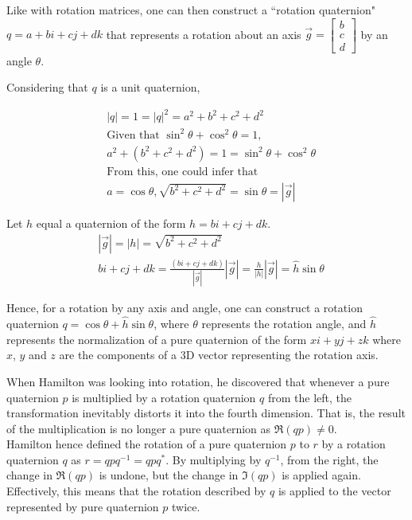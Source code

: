 \documentclass[12pt, a4paper]{article}
\begin{document}
Like with rotation matrices, one can then construct a ``rotation quaternion" $q =
a + bi + cj +dk$ that represents a rotation about an axis $\vec{g} =
\begin{bmatrix} b \\ c \\ d \end{bmatrix}$ by an angle $\theta$. %

Considering that $q$ is a unit quaternion,

\begin{align*}
    &|q| = 1 = |q|^2 = a^2 + b^2 + c^2 + d^2 \\
    &\text{Given that } \sin^2\theta + \cos^2\theta = 1, \\
    &a^2 + (b^2 + c^2 + d^2) = 1 = \sin^2\theta + \cos^2\theta \\
    &\text{From this, one could infer that} \\
    &a = \cos\theta, \sqrt{b^2 + c^2 + d^2} = \sin\theta = |\vec{g}|
\end{align*}

Let $h$ equal a quaternion of the form $h = bi + cj + dk$.
\begin{align*}
    &|\vec{g}| = |h| = \sqrt{b^2 + c^2 + d^2} \\
    &bi + cj + dk = \frac{(bi + cj + dk)}{|\vec{g}|}|\vec{g}| = \frac{h}{|h|}|\vec{g}| = \hat{h}\sin\theta
\end{align*}

Hence, for a rotation by any axis and angle, one can construct a rotation
quaternion $q = \cos\theta + \hat{h}\sin\theta$, where $\theta$ represents the
rotation angle, and $\hat{h}$ represents the normalization of a pure quaternion
of the form $xi + yj + zk$ where $x$, $y$ and $z$ are the components of a 3D
vector representing the rotation axis. \\

\pagebreak

When Hamilton was looking into rotation, he discovered that whenever a pure
quaternion $p$ is multiplied by a rotation quaternion $q$ from the left, the
transformation inevitably distorts it into the fourth dimension. That is, the
result of the multiplication is no longer a pure quaternion as
$\Re(qp) \neq 0$. \\

Hamilton hence defined the rotation of a pure quaternion $p$ to $r$ by a
rotation quaternion $q$ as $r = qpq^{-1} = qpq^*$. By multiplying by $q^{-1}$, from the
right, the change in $\Re(qp)$ is undone, but the change in $\Im(qp)$ is applied
again. Effectively, this means that the rotation described by $q$ is applied to
the vector represented by pure quaternion $p$ twice. \\
\end{document}
